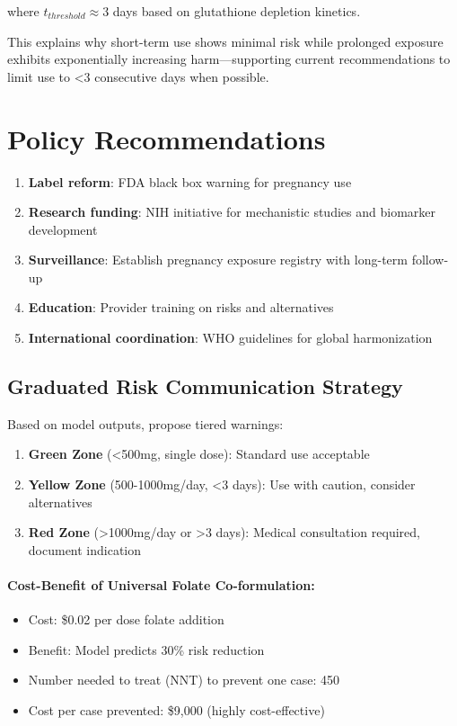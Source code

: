 \documentclass[11pt]{article}
\let\oldsection\section
\renewcommand{\section}[1]{\oldsection{#1}\setlength{\leftskip}{0em}}
\let\oldsubsection\subsection
\renewcommand{\subsection}[1]{\oldsubsection{#1}\setlength{\leftskip}{0.75em}}
\begin{document}
where $t_{threshold} \approx 3$ days based on glutathione depletion kinetics.

This explains why short-term use shows minimal risk while prolonged exposure exhibits exponentially increasing harm—supporting current recommendations to limit use to <3 consecutive days when possible.

\section{Policy Recommendations}

\begin{enumerate}
\item \textbf{Label reform}: FDA black box warning for pregnancy use
\item \textbf{Research funding}: NIH initiative for mechanistic studies and biomarker development
\item \textbf{Surveillance}: Establish pregnancy exposure registry with long-term follow-up
\item \textbf{Education}: Provider training on risks and alternatives
\item \textbf{International coordination}: WHO guidelines for global harmonization
\end{enumerate}

\subsection{Graduated Risk Communication Strategy}

Based on model outputs, propose tiered warnings:

\begin{enumerate}
\item \textbf{Green Zone} (<500mg, single dose): Standard use acceptable
\item \textbf{Yellow Zone} (500-1000mg/day, <3 days): Use with caution, consider alternatives
\item \textbf{Red Zone} (>1000mg/day or >3 days): Medical consultation required, document indication
\end{enumerate}

\paragraph{Cost-Benefit of Universal Folate Co-formulation:}
\begin{itemize}
\item Cost: \$0.02 per dose folate addition
\item Benefit: Model predicts 30\% risk reduction
\item Number needed to treat (NNT) to prevent one case: 450
\item Cost per case prevented: \$9,000 (highly cost-effective)
\end{itemize}
\end{document}

